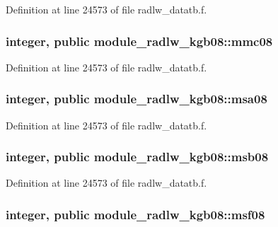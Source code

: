 Definition at line 24573 of file radlw\+\_\+datatb.\+f.

\subsubsection[{\texorpdfstring{mmc08}{mmc08}}]{\setlength{\rightskip}{0pt plus 5cm}integer, public module\+\_\+radlw\+\_\+kgb08\+::mmc08}\hypertarget{namespacemodule__radlw__kgb08_a9e3bfc1880221c18fa07817eb62bcc47}{}\label{namespacemodule__radlw__kgb08_a9e3bfc1880221c18fa07817eb62bcc47}


Definition at line 24573 of file radlw\+\_\+datatb.\+f.

\subsubsection[{\texorpdfstring{msa08}{msa08}}]{\setlength{\rightskip}{0pt plus 5cm}integer, public module\+\_\+radlw\+\_\+kgb08\+::msa08}\hypertarget{namespacemodule__radlw__kgb08_a74e4bd8f4b00d0ff6bae1a39d9bddd3b}{}\label{namespacemodule__radlw__kgb08_a74e4bd8f4b00d0ff6bae1a39d9bddd3b}


Definition at line 24573 of file radlw\+\_\+datatb.\+f.

\subsubsection[{\texorpdfstring{msb08}{msb08}}]{\setlength{\rightskip}{0pt plus 5cm}integer, public module\+\_\+radlw\+\_\+kgb08\+::msb08}\hypertarget{namespacemodule__radlw__kgb08_a3dd391fcce47d3aca3512bbfd946807b}{}\label{namespacemodule__radlw__kgb08_a3dd391fcce47d3aca3512bbfd946807b}


Definition at line 24573 of file radlw\+\_\+datatb.\+f.

\subsubsection[{\texorpdfstring{msf08}{msf08}}]{\setlength{\rightskip}{0pt plus 5cm}integer, public module\+\_\+radlw\+\_\+kgb08\+::msf08}\hypertarget{namespacemodule__radlw__kgb08_a7db22d5a0ece1b1f10cbf64ae1181a09}{}\label{namespacemodule__radlw__kgb08_a7db22d5a0ece1b1f10cbf64ae1181a09}


